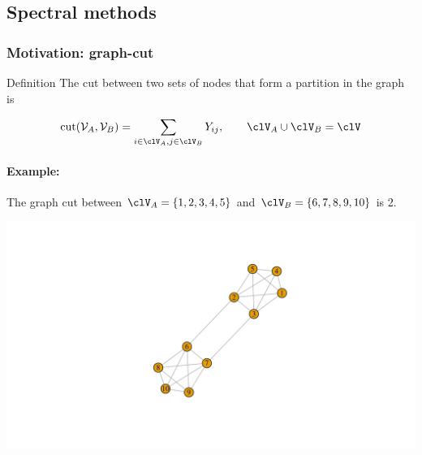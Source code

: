 \documentclass{beamer}\usepackage[]{graphicx}\usepackage[]{color}
\newenvironment{knitrout}{}{} %
\begin{document}
\subsection{Spectral methods}

\begin{frame}[fragile]
  \frametitle{Motivation: graph-cut}
  
  \begin{block}{Definition}
    The cut between two sets of nodes that form a partition in the graph is

$$
\mathrm{cut}(\mathcal{V}_A, \mathcal{V}_B) = \sum_{i\in\clV_A, j\in\clV_B} Y_{ij}, \qquad \clV_A \cup \clV_B = \clV
$$
\end{block}

\paragraph{Example:}
The graph cut between $\clV_A= \{1,2,3,4,5\}$ and $\clV_B= \{6,7,8,9,10\}$ is 2.

\begin{knitrout}\scriptsize
{}\color{fgcolor}
\includegraphics[width=.8\textwidth]{figures/graph-cut-plot-1} 
\end{knitrout}

\end{frame}
\end{document}
